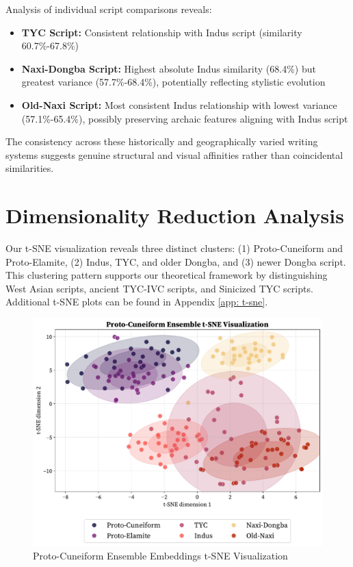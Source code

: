 \documentclass[11pt,a4paper,oneside]{report}
\begin{document}
Analysis of individual script comparisons reveals:

\begin{itemize}
    \item \textbf{TYC Script:} Consistent relationship with Indus script (similarity 60.7\%-67.8\%)

    \item \textbf{Naxi-Dongba Script: }Highest absolute Indus similarity (68.4\%) but greatest variance (57.7\%-68.4\%), potentially reflecting stylistic evolution

    \item \textbf{Old-Naxi Script:} Most consistent Indus relationship with lowest variance (57.1\%-65.4\%), possibly preserving archaic features aligning with Indus script
\end{itemize}

The consistency across these historically and geographically varied writing systems suggests genuine structural and visual affinities rather than coincidental similarities.

\newpage
\section{Dimensionality Reduction Analysis}
\noindent\hspace{1cm}
Our t-SNE visualization reveals three distinct clusters: (1) Proto-Cuneiform and Proto-Elamite, (2) Indus, TYC, and older Dongba, and (3) newer Dongba script. This clustering pattern supports our theoretical framework by distinguishing West Asian scripts, ancient TYC-IVC scripts, and Sinicized TYC scripts. Additional t-SNE plots can be found in Appendix \ref{app: t-sne}.

\begin{figure}[H] 
    \centering
    \includegraphics[width=1\linewidth]{Visualizations/t-SNE/Proto-Cuneiform/ensemble_tsne.pdf}
    \caption{Proto-Cuneiform Ensemble Embeddings t-SNE Visualization}
    \label{fig:t-sne}
\end{figure}
\end{document}
